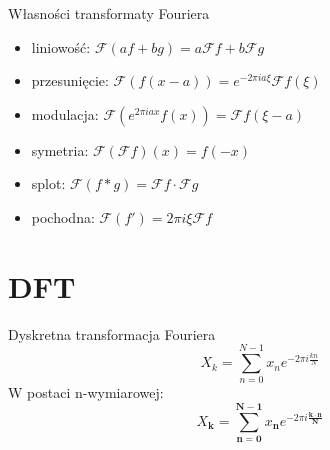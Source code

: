 \documentclass[polish, 12pt, aspectratio=169]{beamer}
\begin{document}
\begin{frame}{Własności transformaty Fouriera}
    \begin{itemize}
        \setlength\itemsep{0.5em}
        \item<2-> liniowość: \( \mathcal{F}(af + bg) = a\mathcal{F}f + b\mathcal{F}g \)
        \item<3-> przesunięcie: \( \mathcal{F}(f(x - a)) = e^{-2\pi i a \xi} \mathcal{F}f(\xi) \)
        \item<3-> modulacja: \( \mathcal{F}(e^{2\pi i a x} f(x)) = \mathcal{F}f(\xi - a) \)
        \item<4-> symetria: \( \mathcal{F}(\mathcal{F}f)(x) = f(-x) \)
        \item<5-> splot: \( \mathcal{F}(f * g) = \mathcal{F}f \cdot \mathcal{F}g \)
        \item<6-> pochodna: \( \mathcal{F}(f') = 2\pi i \xi \mathcal{F}f \)
    \end{itemize}
\end{frame}

\section[DFT \\ {\normalsize Discrete Fourier Transform}]{DFT}

\begin{frame}{Dyskretna transformacja Fouriera}
    \pause{}
    \Huge
    \begin{equation*}
        X_k = \sum_{n=0}^{N-1} x_n e^{-2\pi i \frac{kn}{N}}
    \end{equation*}
    \pause{}
    \small
    W postaci n-wymiarowej:
    \normalsize
    \vspace{-1em}
    \begin{equation*}
        X_{\symbf{k}} = \sum_{\symbf{n} = \symbf{0}}^{\symbf{N} - \symbf{1}} x_{\symbf{n}} e^{-2\pi i \frac{\symbf{k \cdot n}}{\symbf{N}}}
    \end{equation*}
\end{frame}
\end{document}
